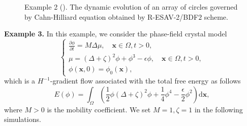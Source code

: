 \documentclass[final,review,onefignum,onetabnum]{siamart190516}
\theoremstyle{plain}
\begin{document}
\begin{figure}[htbp]
\centering
{} 
\label{Fig:CH-circles-RESAV2}
\caption{Example 2 (). The dynamic evolution of an array of circles governed by Cahn-Hilliard equation obtained by R-ESAV-2/BDF$2$ scheme.}
\end{figure}


\textbf{Example 3.} In this example, we consider the phase-field crystal model 
\begin{equation}
\left\{
\begin{array}{l}\frac{\partial \phi}{\partial t}=M \Delta \mu,  \quad \boldsymbol{x} \in \Omega, t>0, \\ 
\mu=(\Delta+\zeta)^{2} \phi+\phi^{3}-\epsilon \phi, \quad \boldsymbol{x} \in \Omega, t>0, \\ 
\phi(\boldsymbol{x}, 0)=\phi_{0}(\boldsymbol{x}),
\end{array}\right.
\end{equation} 
which is a $H^{-1}$-gradient flow associated with the total free energy as follows
\begin{equation}
	E(\phi)=\int_{\Omega}\left(\frac{1}{2} \phi(\Delta+\zeta)^{2} \phi+\frac{1}{4} \phi^{4}-\frac{\epsilon}{2} \phi^{2}\right) \mathrm{d} \boldsymbol{x},
\end{equation}
where $M>0$ is the mobility coefficient. 
We set $M=1, \zeta=1$ in the following simulations. 
\end{document}
